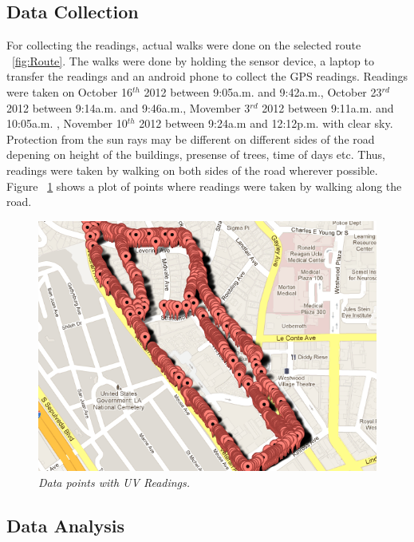 \documentclass[12pt,fullpage,doublespace]{article}
\begin{document}
\subsection{Data Collection}
For collecting the readings, actual walks were done on the selected route ~\ref{fig:Route}. The walks were done by holding the sensor device, a laptop to transfer the readings and an android phone to collect the GPS readings. Readings were taken on October 16$^{th}$ 2012 between 9:05a.m. and 9:42a.m., October 23$^{rd}$ 2012 between 9:14a.m. and 9:46a.m., Movember 3$^{rd}$ 2012 between 9:11a.m. and 10:05a.m. , November 10$^{th}$ 2012 between 9:24a.m and 12:12p.m. with clear sky. Protection from the sun rays may be different on different sides of the road depening on height of the buildings, presense of trees, time of days etc. Thus, readings were taken by walking on both sides of the road wherever possible. Figure ~\ref{fig:dataPoints} shows a plot of points where readings were taken by walking along the road.
\begin{figure}
\begin{center}
\includegraphics[scale=0.35]{dataPoints.png}
\caption{\small \sl Data points with UV Readings.\label{fig:dataPoints}}
\end{center}
\end{figure}

\subsection{Data Analysis}
\end{document}
